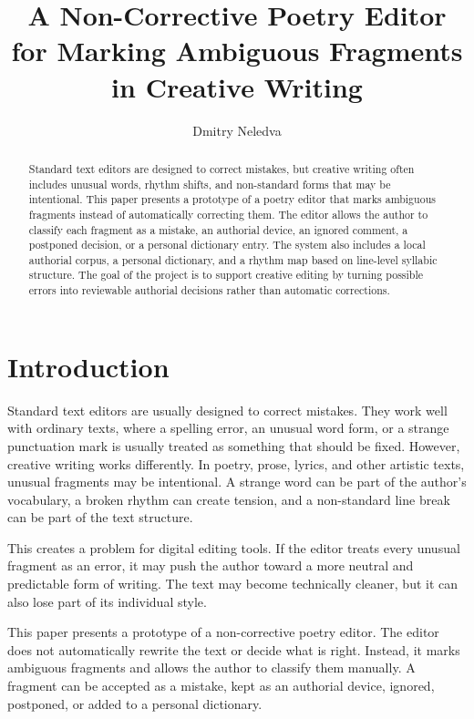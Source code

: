\documentclass[sigconf]{acmart}
\title{A Non-Corrective Poetry Editor for Marking Ambiguous Fragments in Creative Writing}
\author{Dmitry Neledva}
\affiliation{%
  \institution{Independent Project}
  \city{Vladimir}
  \country{Russia}
}
\begin{document}
\begin{abstract}
Standard text editors are designed to correct mistakes, but creative writing often includes unusual words, rhythm shifts, and non-standard forms that may be intentional. This paper presents a prototype of a poetry editor that marks ambiguous fragments instead of automatically correcting them. The editor allows the author to classify each fragment as a mistake, an authorial device, an ignored comment, a postponed decision, or a personal dictionary entry. The system also includes a local authorial corpus, a personal dictionary, and a rhythm map based on line-level syllabic structure. The goal of the project is to support creative editing by turning possible errors into reviewable authorial decisions rather than automatic corrections.
\end{abstract}


\maketitle

\section{Introduction}

Standard text editors are usually designed to correct mistakes. They work well with ordinary texts, where a spelling error, an unusual word form, or a strange punctuation mark is usually treated as something that should be fixed. However, creative writing works differently. In poetry, prose, lyrics, and other artistic texts, unusual fragments may be intentional. A strange word can be part of the author's vocabulary, a broken rhythm can create tension, and a non-standard line break can be part of the text structure.

This creates a problem for digital editing tools. If the editor treats every unusual fragment as an error, it may push the author toward a more neutral and predictable form of writing. The text may become technically cleaner, but it can also lose part of its individual style.

This paper presents a prototype of a non-corrective poetry editor. The editor does not automatically rewrite the text or decide what is right. Instead, it marks ambiguous fragments and allows the author to classify them manually. A fragment can be accepted as a mistake, kept as an authorial device, ignored, postponed, or added to a personal dictionary.
\end{document}
